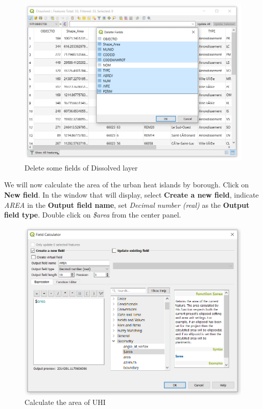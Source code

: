 \documentclass[]{book}
\theoremstyle{definition}
\theoremstyle{definition}
\theoremstyle{definition}
\theoremstyle{remark}
\begin{document}
\begin{figure}

{\centering \includegraphics[width=13.75in]{figures/Delete_Fields} 

}

\caption{Delete some fields of Dissolved layer}\label{fig:unnamed-chunk-33}
\end{figure}

We will now calculate the area of the urban heat islands by borough.
Click on \textbf{New field}. In the window that will display, select
\textbf{Create a new field}, indicate \emph{AREA} in the \textbf{Output
field name}, set \emph{Decimal number (real)} as the \textbf{Output
field type}. Double click on \emph{\$area} from the center panel.

\begin{figure}

{\centering \includegraphics[width=12.49in]{figures/Calculate_Area} 

}

\caption{Calculate the area of UHI}\label{fig:unnamed-chunk-34}
\end{figure}
\end{document}
